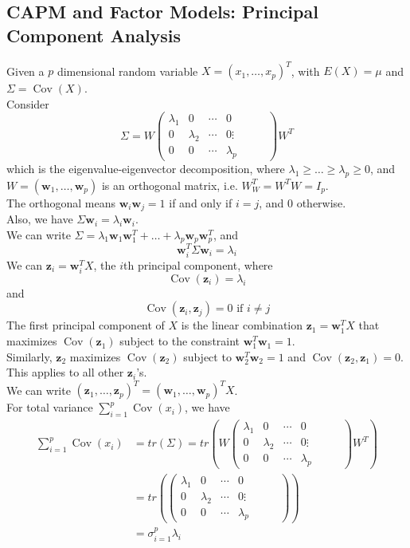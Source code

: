 \documentclass[12pt]{article}
\theoremstyle{definition}
\DeclareMathOperator{\cov}{Cov}
\begin{document}
\subsection{CAPM and Factor Models: Principal Component Analysis}
Given a $p$ dimensional random variable $X=(x_1,\ldots, x_p)^T$, with $E(X)=\mu$ and $\Sigma=\cov(X)$.\\
Consider 
\[
\Sigma=W\begin{pmatrix}\lambda_1 & 0 & \cdots & 0 \\ 0 & \lambda_2 & \cdots & 0 \vdots &&& \\ 0 & 0 & \cdots &\lambda_p\end{pmatrix} W^T
\]
which is the eigenvalue-eigenvector decomposition, where $\lambda_1\geq \ldots\geq \lambda_p\geq 0$, and $W=(\mathbf{w}_1,\ldots, \mathbf{w}_p)$ is an orthogonal matrix, i.e. $W_W^T = W^TW=I_p$.\\
The orthogonal means $\mathbf{w}_i\mathbf{w}_j = 1$ if and only if $i=j$, and $0$ otherwise.\\
Also, we have $\Sigma \mathbf{w}_i = \lambda_i\mathbf{w}_i$.\\
We can write $\Sigma = \lambda_1 \mathbf{w}_1\mathbf{w}_1^T + \ldots + \lambda_p \mathbf{w}_p\mathbf{w}_p^T$, and
\[
\mathbf{w}_i^T\Sigma\mathbf{w}_i = \lambda_i
\]
We can $\mathbf{z}_i = \mathbf{w}_i^TX$, the $i$th principal component, where
\[
\cov(\mathbf{z}_i) = \lambda_i
\]
and
\[
\cov(\mathbf{z}_i, \mathbf{z}_j) = 0 \text{ if }i\neq j
\]
The first principal component of $X$ is the linear combination $\mathbf{z}_1 = \mathbf{w}_1^T X$ that maximizes $\cov(\mathbf{z}_1)$ subject to the constraint $\mathbf{w}_1^T\mathbf{w}_1 = 1$.\\
Similarly, $\mathbf{z}_2$ maximizes $\cov(\mathbf{z}_2)$ subject to $\mathbf{w}_2^T\mathbf{w}_2=1$ and $\cov(\mathbf{z}_2, \mathbf{z}_1) = 0$.\\
This applies to all other $\mathbf{z}_i$'s.\\
We can write $(\mathbf{z}_1,\ldots, \mathbf{z}_p)^T = (\mathbf{w}_1,\ldots, \mathbf{w}_p)^TX$.\\
For total variance $\sum_{i=1}^p \cov(x_i)$, we have
\begin{align*}
\sum_{i=1}^p \cov(x_i) &= tr(\Sigma) = tr(W\begin{pmatrix}\lambda_1 & 0 & \cdots & 0 \\ 0 & \lambda_2 & \cdots & 0 \vdots &&& \\ 0 & 0 & \cdots &\lambda_p\end{pmatrix} W^T)\\
&=tr(\begin{pmatrix}\lambda_1 & 0 & \cdots & 0 \\ 0 & \lambda_2 & \cdots & 0 \vdots &&& \\ 0 & 0 & \cdots &\lambda_p\end{pmatrix})\\
&=\sigma_{i=1}^p \lambda_i
\end{align*}
\end{document}
